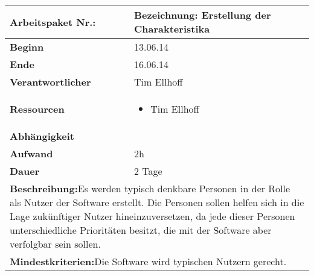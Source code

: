 \documentclass[fontsize=12pt,paper=a4,twoside]{scrartcl}
\begin{document}
	\begin{verbatim} 
	\end{verbatim}
	
	\begin{tabular}{|p{5.3cm}|p{9.7cm}|}\hline
		\textbf{Arbeitspaket Nr.:}  & \textbf{Bezeichnung:} Erstellung der Charakteristika\\ \hline \hline
		\textbf{Beginn} & 13.06.14\\ \hline
		\textbf{Ende} & 16.06.14\\ \hline
		\textbf{Verantwortlicher} & Tim Ellhoff\\ \hline
		\textbf{Ressourcen} & \begin{itemize}
			\item Tim Ellhoff
		\end{itemize}    \\ \hline
		\textbf{Abhängigkeit} &\\ \hline
		\textbf{Aufwand} & 2h\\ \hline
		\textbf{Dauer} & 2 Tage\\ \hline
		\multicolumn{2}{|p{15cm}|}{\textbf{Beschreibung:}\newline Es werden typisch denkbare Personen in der Rolle als Nutzer der Software erstellt. Die Personen sollen helfen sich in die Lage zukünftiger Nutzer hineinzuversetzen, da jede dieser Personen unterschiedliche Prioritäten besitzt, die mit der Software aber verfolgbar sein sollen. }\\ \hline
		\multicolumn{2}{|p{15cm}|}{\textbf{Mindestkriterien:}\newline Die Software wird typischen Nutzern gerecht. }\\ \hline
	\end{tabular}
	
	\begin{verbatim} 
	\end{verbatim}
	
\end{document}

